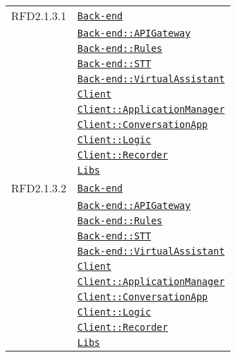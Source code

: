 \begin{longtable}{|>{\centering}m{3cm}|m{10cm}<{\centering}|}
RFD2.1.3.1 & \hyperref[Back-end]{\texttt{Back-end}}\\
& \hyperref[Back-end::APIGateway]{\texttt{Back-end::APIGateway}}\\
& \hyperref[Back-end::Rules]{\texttt{Back-end::Rules}}\\
& \hyperref[Back-end::STT]{\texttt{Back-end::STT}}\\
& \hyperref[Back-end::VirtualAssistant]{\texttt{Back-end::VirtualAssistant}}\\
& \hyperref[Client]{\texttt{Client}}\\
& \hyperref[Client::ApplicationManager]{\texttt{Client::ApplicationManager}}\\
& \hyperref[Client::ConversationApp]{\texttt{Client::ConversationApp}}\\
& \hyperref[Client::Logic]{\texttt{Client::Logic}}\\
& \hyperref[Client::Recorder]{\texttt{Client::Recorder}}\\
& \hyperref[Libs]{\texttt{Libs}}\\ \hline

RFD2.1.3.2 & \hyperref[Back-end]{\texttt{Back-end}}\\
& \hyperref[Back-end::APIGateway]{\texttt{Back-end::APIGateway}}\\
& \hyperref[Back-end::Rules]{\texttt{Back-end::Rules}}\\
& \hyperref[Back-end::STT]{\texttt{Back-end::STT}}\\
& \hyperref[Back-end::VirtualAssistant]{\texttt{Back-end::VirtualAssistant}}\\
& \hyperref[Client]{\texttt{Client}}\\
& \hyperref[Client::ApplicationManager]{\texttt{Client::ApplicationManager}}\\
& \hyperref[Client::ConversationApp]{\texttt{Client::ConversationApp}}\\
& \hyperref[Client::Logic]{\texttt{Client::Logic}}\\
& \hyperref[Client::Recorder]{\texttt{Client::Recorder}}\\
& \hyperref[Libs]{\texttt{Libs}}\\ \hline


\end{longtable}

